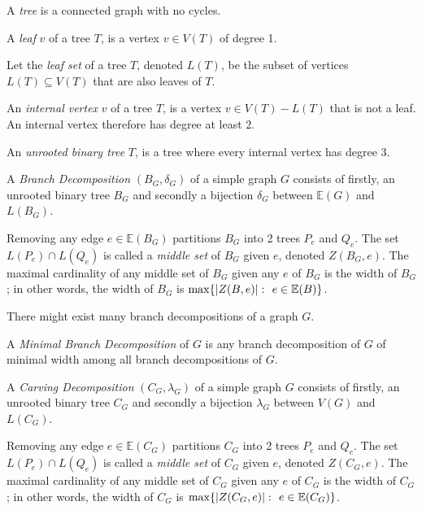 \documentclass{article}
\begin{document}
	\begin{center}
		
	\end{center}

	A \textit{tree} is a connected graph with no cycles.

	A \textit{leaf} $v$ of a tree $T$, is a vertex $v \in V(T)$ of degree 1.

	Let the \textit{leaf set} of a tree $T$, denoted $L(T)$, be the subset of vertices $L(T) \subseteq V(T)$ that are also leaves of $T$.
	
	An \textit{internal vertex} $v$ of a tree $T$, is a vertex $v \in V(T) - L(T)$ that is not a leaf. An internal vertex therefore has degree at least 2.

	An \textit{unrooted binary tree} $T$, is a tree where every internal vertex has degree 3.

	A \textit{Branch Decomposition} $(B_G, \delta_G)$ of a simple graph $G$ consists of firstly, an unrooted binary tree $B_G$ and secondly a bijection $\delta_G$ between $\mathbb{E}(G)$ and $L(B_G)$.

	\begin{center}
		
	\end{center}

	Removing any edge $e \in \mathbb{E}(B_G)$ partitions $B_G$ into 2 trees $P_e$ and $Q_e$. The set $L(P_e) \cap L(Q_e)$ is called a \textit{middle set} of $B_G$ given $e$, denoted $Z(B_G,e)$. The maximal cardinality of any middle set of $B_G$ given any $e$ of $B_G$ is the width of $B_G$; in other words, the width of $B_G$ is $\max\{ |Z(B, e)| \,\colon\  e \in \mathbb{E}(B) \}$.

	There might exist many branch decompositions of a graph $G$.

	A \textit{Minimal Branch Decomposition} of $G$ is any branch decomposition of $G$ of minimal width among all branch decompositions of $G$.

	A \textit{Carving Decomposition} $(C_G, \lambda_G)$ of a simple graph $G$ consists of firstly, an unrooted binary tree $C_G$ and secondly a bijection $\lambda_G$ between $V(G)$ and $L(C_G)$.

	Removing any edge $e \in \mathbb{E}(C_G)$ partitions $C_G$ into 2 trees $P_e$ and $Q_e$. The set $L(P_e) \cap L(Q_e)$ is called a \textit{middle set} of $C_G$ given $e$, denoted $Z(C_G,e)$. The maximal cardinality of any middle set of $C_G$ given any $e$ of $C_G$ is the width of $C_G$; in other words, the width of $C_G$ is $\max\{ |Z(C_G, e)| \,\colon\  e \in \mathbb{E}(C_G) \}$.
\end{document}
